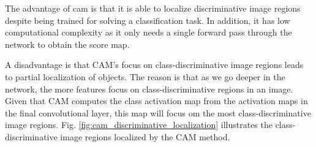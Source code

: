 The advantage of \acrlong{cam} is that it is able to localize discriminative image regions despite being trained for solving a classification task. In addition, it has low computational complexity as it only needs a single forward pass through the network to obtain the score map.

A disadvantage is that CAM's focus on class-discriminative image regions leads to partial localization of objects. The reason is that as we go deeper in the network, the more features focus on class-discriminative regions in an image. Given that CAM computes the class activation map from the activation maps in the final convolutional layer, this map will focus om the most class-discriminative image regions. Fig. \ref{fig:cam_discriminative_localization} illustrates the class-discriminative image regions localized by the CAM method.

